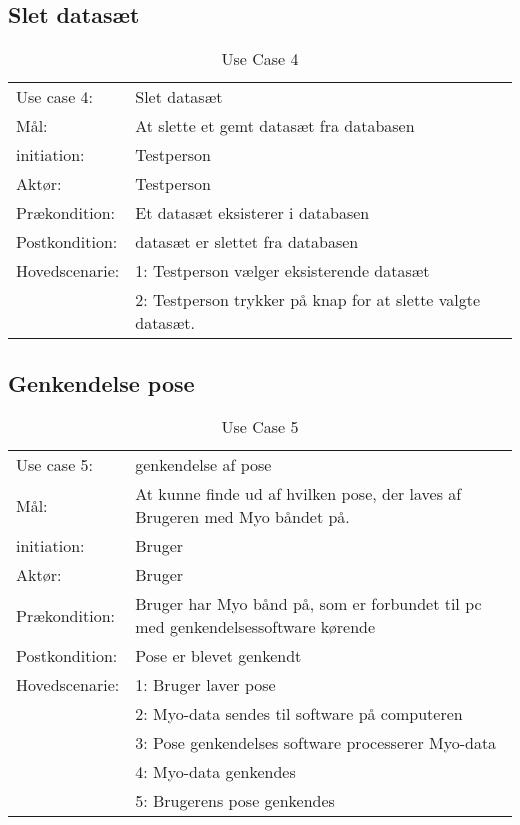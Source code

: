 \subsection{Slet datasæt}
\begin{center}
	\begin{table}[htbp]
		\begin{tabular}{lp{274pt}}
			\rowcolor{grey} Use case 4:	& Slet datasæt \\
			Mål:	& At slette et gemt datasæt fra databasen \\
			initiation:	& Testperson\\
			Aktør: & Testperson\\
			Prækondition: & Et datasæt eksisterer i databasen\\
			Postkondition: & datasæt er slettet fra databasen\\
			Hovedscenarie: & 1: Testperson vælger eksisterende datasæt\\
			& 2: Testperson trykker på knap for at slette valgte datasæt.
		\end{tabular}
		\caption{Use Case 4}
	\end{table}
\end{center}

\subsection{Genkendelse pose}
\begin{center}
	\begin{table}[htbp]
		\begin{tabular}{lp{274pt}}
			\rowcolor{grey} Use case 5:		& genkendelse af pose\\
			Mål: & At kunne finde ud af hvilken pose, der laves af Brugeren med Myo båndet på. \\
			initiation:	& Bruger \\
			Aktør: & Bruger\\
			Prækondition: & Bruger har Myo bånd på, som er forbundet til pc med genkendelsessoftware kørende \\
			Postkondition: & Pose er blevet genkendt \\
			Hovedscenarie: & 1: Bruger laver pose \\
			& 2: Myo-data sendes til software på computeren\\
			& 3: Pose genkendelses software processerer Myo-data\\
			& 4: Myo-data genkendes\\
			& 5: Brugerens pose genkendes\\
		\end{tabular}
		\caption{Use Case 5}
	\end{table}
\end{center}

